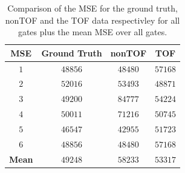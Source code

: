 \documentclass[journal]{IEEEtran}
\begin{document}
\begin{table}[H]
    \centering
        \caption{Comparison of the MSE for the ground truth, nonTOF and the TOF data respectivley for all gates plus the mean MSE over all gates.}
    \begin{tabular}{||c|ccc||}
    \hline
        \textbf{MSE}    & \textbf{Ground Truth} & \textbf{nonTOF}   & \textbf{TOF}  \\
    \hline
        \textbf{$1$}    & $48856$               & $48480$           & $57168$       \\
        \textbf{$2$}    & $52016$               & $53493$           & $48871$       \\
        \textbf{$3$}    & $49200$               & $84777$           & $54224$       \\
        \textbf{$4$}    & $50011$               & $71216$           & $50745$       \\
        \textbf{$5$}    & $46547$               & $42955$           & $51723$       \\
        \textbf{$6$}    & $48856$               & $48480$           & $57168$       \\
    \hline
        \textbf{Mean}   & $49248$               & $58233$           & $53317$       \\
    \hline
    \end{tabular}
    \label{tab:mse}
\end{table}



%
%
\end{document}
